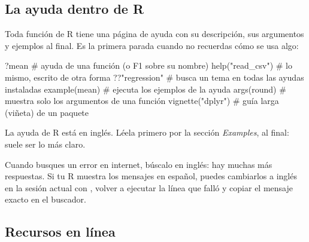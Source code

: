 \subsection{La ayuda dentro de R}

Toda función de R tiene una página de ayuda con su descripción, sus
argumentos y ejemplos al final. Es la primera parada cuando no recuerdas
cómo se usa algo:

\begin{rnoejecutar}
?mean                      # ayuda de una función (o F1 sobre su nombre)
help("read_csv")           # lo mismo, escrito de otra forma
??"regression"             # busca un tema en todas las ayudas instaladas
example(mean)              # ejecuta los ejemplos de la ayuda
args(round)                # muestra solo los argumentos de una función
vignette("dplyr")          # guía larga (viñeta) de un paquete
\end{rnoejecutar}

La ayuda de R está en inglés. Léela primero por la sección
\textit{Examples}, al final: suele ser lo más claro.

\begin{consejo}
Cuando busques un error en internet, búscalo en inglés: hay muchas más
respuestas. Si tu R muestra los mensajes en español, puedes cambiarlos a
inglés en la sesión actual con , volver
a ejecutar la línea que falló y copiar el mensaje exacto en el buscador.
\end{consejo}

\subsection{Recursos en línea}


